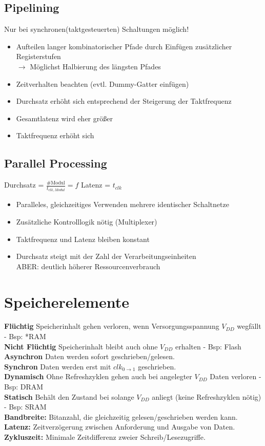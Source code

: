 \documentclass[6pt,a4paper]{scrartcl}
\renewcommand{\emph}[1]{\textsf{\textbf{#1}}}
\newcommand{\ra}[0]{\ensuremath{\rightarrow}} 									%
\begin{document}
\begin{multicols*}{3}
	\subsection{Pipelining} %
	Nur bei synchronen(taktgesteuerten) Schaltungen möglich!
	\begin{itemize} \itemsep0pt
		\item Aufteilen langer kombinatorischer Pfade durch Einfügen zusätzlicher Registerstufen\\
		$\ra$ Möglichst Halbierung des längsten Pfades
		\item Zeitverhalten beachten (evtl. Dummy-Gatter einfügen)
		\item Durchsatz erhöht sich entsprechend der Steigerung der Taktfrequenz
		\item Gesamtlatenz wird eher größer
		\item Taktfrequenz erhöht sich
	\end{itemize}
	
	\subsection{Parallel Processing} %
	
	Durchsatz = $\frac{\#\text{Modul}}{t_{clk,Modul}} = f$ \qquad \quad Latenz = $t_{clk}$
	\begin{itemize} \itemsep0pt
		\item Paralleles, gleichzeitiges Verwenden mehrere identischer Schaltnetze
		\item Zusätzliche Kontrolllogik nötig (Multiplexer)
		\item Taktfrequenz und Latenz bleiben konstant
		\item Durchsatz steigt mit der Zahl der Verarbeitungseinheiten \\
		ABER: deutlich höherer Ressourcenverbrauch
	\end{itemize}


\section{Speicherelemente}
	\emph{Flüchtig} Speicherinhalt gehen verloren, wenn Versorgungsspannung $V_{DD}$ wegfällt - Bsp: *RAM\\
	\emph{Nicht Flüchtig} Speicherinhalt bleibt auch ohne $V_{DD}$ erhalten - Bsp: Flash\\
	\emph{Asynchron} Daten werden sofort geschrieben/gelesen.\\
	\emph{Synchron} Daten werden erst mit $clk_{0 \ra 1}$ geschrieben.\\
	\emph{Dynamisch} Ohne Refreshzyklen gehen auch bei angelegter $V_{DD}$ Daten verloren -  Bsp: DRAM\\
	\emph{Statisch} Behält den Zustand bei solange $V_{DD}$ anliegt (keine Refreshzyklen nötig) - Bsp: SRAM\\
	\emph{Bandbreite:} Bitanzahl, die gleichzeitig gelesen/geschrieben werden kann.
	\emph{Latenz:} Zeitverzögerung zwischen Anforderung und Ausgabe von Daten.
	\emph{Zykluszeit:} Minimale Zeitdifferenz zweier Schreib/Lesezugriffe.
	

\end{multicols*}
\end{document}
